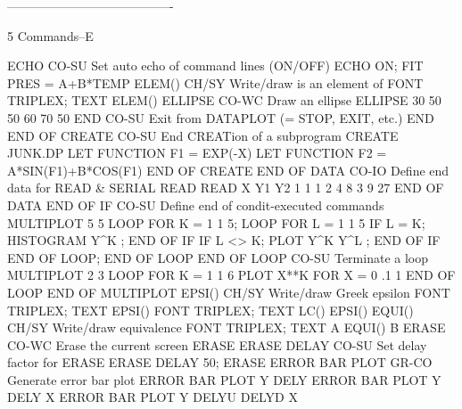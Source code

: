 ----------------------------------------
 
5
Commands--E
 
ECHO                        CO-SU Set auto echo of command lines (ON/OFF)
                                  ECHO ON; FIT PRES = A+B*TEMP
ELEM()                      CH/SY Write/draw is an element of
                                  FONT TRIPLEX; TEXT ELEM()
ELLIPSE                     CO-WC Draw an ellipse
                                  ELLIPSE 30 50 50 60 70 50
END                         CO-SU Exit from DATAPLOT (= STOP, EXIT, etc.)
                                  END
END OF CREATE               CO-SU End CREATion of a subprogram
                                  CREATE JUNK.DP
                                  LET FUNCTION F1 = EXP(-X)
                                  LET FUNCTION F2 = A*SIN(F1)+B*COS(F1)
                                  END OF CREATE
END OF DATA                 CO-IO Define end data for READ & SERIAL READ
                                  READ X Y1 Y2
                                  1 1 1
                                  2 4 8
                                  3 9 27
                                  END OF DATA
END OF IF                   CO-SU Define end of condit-executed commands
                                  MULTIPLOT 5 5
                                  LOOP FOR K = 1 1 5; LOOP FOR L = 1 1 5
                                  IF L = K; HISTOGRAM Y^K ; END OF IF
                                  IF L <> K; PLOT Y^K Y^L ; END OF IF
                                  END OF LOOP; END OF LOOP
END OF LOOP                 CO-SU Terminate a loop
                                  MULTIPLOT 2 3
                                  LOOP FOR K = 1 1 6
                                  PLOT X**K FOR X = 0 .1 1
                                  END OF LOOP
END OF MULTIPLOT
EPSI()                      CH/SY Write/draw Greek epsilon
                                  FONT TRIPLEX; TEXT EPSI()
                                  FONT TRIPLEX; TEXT LC() EPSI()
EQUI()                      CH/SY Write/draw equivalence
                                  FONT TRIPLEX; TEXT A EQUI() B
ERASE                       CO-WC Erase the current screen
                                  ERASE
ERASE DELAY                 CO-SU Set delay factor for ERASE
                                  ERASE DELAY 50; ERASE
ERROR BAR PLOT              GR-CO Generate error bar plot
                                  ERROR BAR PLOT Y DELY
                                  ERROR BAR PLOT Y DELY X
                                  ERROR BAR PLOT Y DELYU DELYD X
